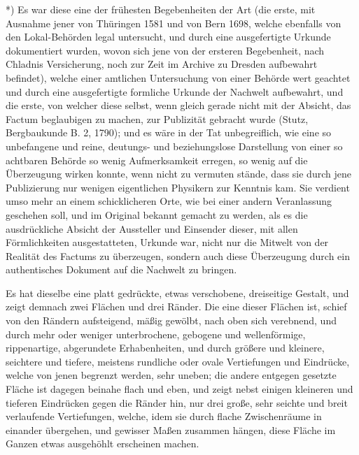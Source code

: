 \documentclass[a4paper, 11pt, oneside, german]{article}
\begin{document}
*) Es war diese eine der frühesten Begebenheiten der Art (die erste, mit Ausnahme jener von Thüringen 1581 und von Bern 1698, welche ebenfalls von den Lokal-Behörden legal untersucht, und durch eine ausgefertigte Urkunde dokumentiert wurden, wovon sich jene von der ersteren Begebenheit, nach Chladnis Versicherung, noch zur Zeit im Archive zu Dresden aufbewahrt befindet), welche einer amtlichen Untersuchung von einer Behörde wert geachtet und durch eine ausgefertigte formliche Urkunde der Nachwelt aufbewahrt, und die erste, von welcher diese selbst, wenn gleich gerade nicht mit der Absicht, das Factum beglaubigen zu machen, zur Publizität gebracht wurde (Stutz, Bergbaukunde B. 2, 1790); und es wäre in der Tat unbegreiflich, wie eine so unbefangene und reine, deutungs- und beziehungslose Darstellung von einer so achtbaren Behörde so wenig Aufmerksamkeit erregen, so wenig auf die Überzeugung wirken konnte, wenn nicht zu vermuten stände, dass sie durch jene Publizierung nur wenigen eigentlichen Physikern zur Kenntnis kam. Sie verdient umso mehr an einem schicklicheren Orte, wie bei einer andern Veranlassung geschehen soll, und im Original bekannt gemacht zu werden, als es die ausdrückliche Absicht der Aussteller und Einsender dieser, mit allen Förmlichkeiten ausgestatteten, Urkunde war, nicht nur die Mitwelt von der Realität des Factums zu überzeugen, sondern auch diese Überzeugung durch ein authentisches Dokument auf die Nachwelt zu bringen.

Es hat dieselbe eine platt gedrückte, etwas verschobene, dreiseitige Gestalt, und zeigt demnach zwei Flächen und drei Ränder. Die eine dieser Flächen ist, schief von den Rändern aufsteigend, mäßig gewölbt, nach oben sich verebnend, und durch mehr oder weniger unterbrochene, gebogene und wellenförmige, rippenartige, abgerundete Erhabenheiten, und durch größere und kleinere, seichtere und tiefere, meistens rundliche oder ovale Vertiefungen und Eindrücke, welche von jenen begrenzt werden, sehr uneben; die andere entgegen gesetzte Fläche ist dagegen beinahe flach und eben, und zeigt nebst einigen kleineren und tieferen Eindrücken gegen die Ränder hin, nur drei große, sehr seichte und breit verlaufende Vertiefungen, welche, idem sie durch flache Zwischenräume in einander übergehen, und gewisser Maßen zusammen hängen, diese Fläche im Ganzen etwas ausgehöhlt erscheinen machen.
\end{document}
